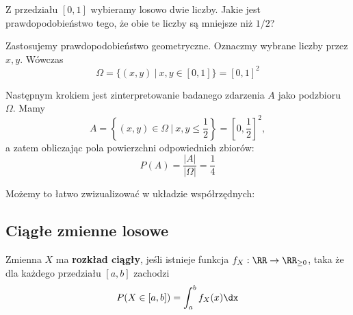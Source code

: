 \begin{example}
    Z przedziału $[0, 1]$ wybieramy losowo dwie liczby. Jakie jest prawdopodobieństwo tego, że obie te liczby są mniejsze niż $1/2$?

    Zastosujemy prawdopodobieństwo geometryczne. Oznaczmy wybrane liczby przez $x, y$. Wówczas
    $$\Omega = \{(x, y) \ | \ x, y \in [0, 1]\} = [0, 1]^2$$

    Następnym krokiem jest zinterpretowanie badanego zdarzenia $A$ jako podzbioru $\Omega$. Mamy
    $$A = \left\{(x, y) \in \Omega \ | \ x, y \leq \frac{1}{2}\right\} = \left[0, \frac{1}{2}\right]^2,$$
    a zatem obliczając pola powierzchni odpowiednich zbiorów:
    $$P(A) = \frac{|A|}{|\Omega|} = \frac{1}{4}$$

    Możemy to łatwo zwizualizować w układzie współrzędnych:
    \begin{center}
    \end{center}
\end{example}

\subsection{Ciągłe zmienne losowe}

Zmienna $X$ ma \textbf{rozkład ciągły}, jeśli istnieje funkcja $f_X : \RR \to \RR_{\geq0}$, taka że dla każdego przedziału $[a, b]$ zachodzi
$$P(X \in [a, b]) = \int_a^b f_X(x) \dx$$


